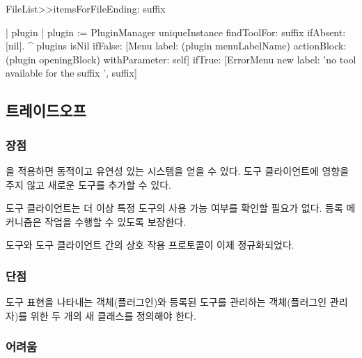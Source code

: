 \documentclass[a4paper,10pt,twoside]{book}
\begin{document}
\begin{code}
FileList>>itemsForFileEnding: suffix
	
	| plugin |
	plugin := PluginManager uniqueInstance
							findToolFor: suffix ifAbsent: [nil].
	^ plugins isNil 
			ifFalse: [Menu label: (plugin menuLabelName)
									actionBlock: (plugin openingBlock)
									withParameter: self]
			ifTrue: [ErrorMenu new 
								label: 'no tool available for the suffix ', suffix]	
\end{code}

\subsection*{트레이드오프}

\subsubsection*{장점}

\begin{bulletlist}
\item {}을 적용하면 동적이고 유연성 있는 시스템을 얻을 수 있다. 도구 클라이언트에 영향을 주지 않고 새로운 도구를 추가할 수 있다.

\item 도구 클라이언트는 더 이상 특정 도구의 사용 가능 여부를 확인할 필요가 없다. 등록 메커니즘은 작업을 수행할 수 있도록 보장한다.

\item 도구와 도구 클라이언트 간의 상호 작용 프로토콜이 이제 정규화되었다.
\end{bulletlist}

\subsubsection*{단점}

\begin{bulletlist}
\item 도구 표현을 나타내는 객체(플러그인)와 등록된 도구를 관리하는 객체(플러그인 관리자)를 위한 두 개의 새 클래스를 정의해야 한다.
\end{bulletlist}

\subsubsection*{어려움}
\end{document}
